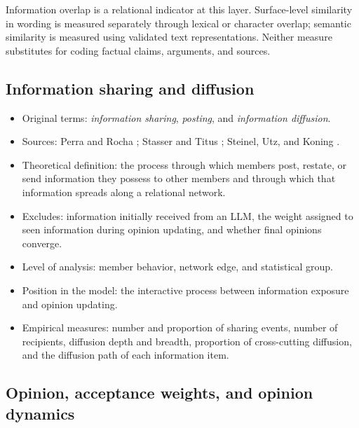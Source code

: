 \documentclass[11pt,a4paper]{article}
\newcommand{\term}[1]{\textit{#1}}
\begin{document}
Information overlap is a relational indicator at this layer. Surface-level similarity in wording is measured separately through lexical or character overlap; semantic similarity is measured using validated text representations. Neither measure substitutes for coding factual claims, arguments, and sources.

\subsection{Information sharing and diffusion}

\begin{itemize}
\item Original terms: \term{information sharing}, \term{posting}, and \term{information diffusion}.
\item Sources: Perra and Rocha \cite{perra2019}; Stasser and Titus \cite{stasser1985}; Steinel, Utz, and Koning \cite{steinel2010}.
\item Theoretical definition: the process through which members post, restate, or send information they possess to other members and through which that information spreads along a relational network.
\item Excludes: information initially received from an LLM, the weight assigned to seen information during opinion updating, and whether final opinions converge.
\item Level of analysis: member behavior, network edge, and statistical group.
\item Position in the model: the interactive process between information exposure and opinion updating.
\item Empirical measures: number and proportion of sharing events, number of recipients, diffusion depth and breadth, proportion of cross-cutting diffusion, and the diffusion path of each information item.
\end{itemize}

\subsection{Opinion, acceptance weights, and opinion dynamics}
\end{document}
